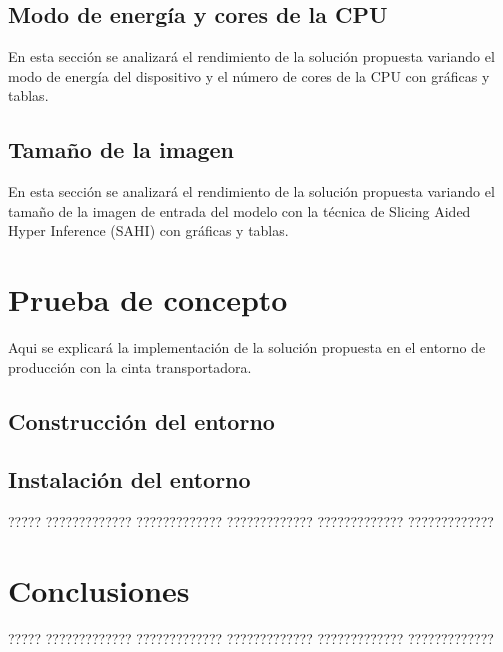 \documentclass[11pt,catalan,listoffigures,listoftables]{tfgetsinf}
\begin{document}
\section{Modo de energía y cores de la CPU}
En esta sección se analizará el rendimiento de la solución propuesta variando el modo de energía del dispositivo y el número de cores de la CPU con gráficas y tablas.

\section{Tamaño de la imagen}
En esta sección se analizará el rendimiento de la solución propuesta variando el tamaño de la imagen de entrada del modelo con la técnica de Slicing Aided Hyper Inference (SAHI) con gráficas y tablas.

\chapter{Prueba de concepto}
Aqui se explicará la implementación de la solución propuesta en el entorno de producción con la cinta transportadora.

\section{Construcción del entorno}

\section{Instalación del entorno}






????? ????????????? ????????????? ????????????? ????????????? ?????????????



\chapter{Conclusiones}

????? ????????????? ????????????? ????????????? ????????????? ????????????? 

\end{document}
